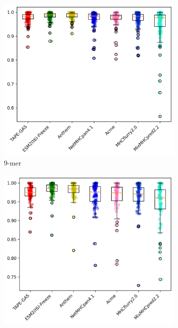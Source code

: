 \begin{figure}[h]
	\centering
	\begin{subfigure}[b]{0.3\textwidth}
		\centering
		\includegraphics[width=\textwidth]{../img/results/auc_distribution_9-mer}
		\caption{9-mer}
		\label{fig:comparison_9}
	\end{subfigure}
	\hfill
	\begin{subfigure}[b]{0.3\textwidth}
		\centering
		\includegraphics[width=\textwidth]{../img/results/auc_distribution_10-mer}

\end{subfigure}
\end{figure}
